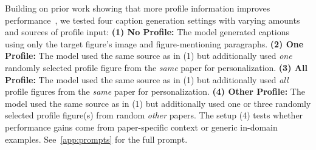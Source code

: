 




Building on prior work showing that more profile information improves performance~\cite{tan2024democratizing}, we tested four caption generation settings with varying amounts and sources of profile input:
\textbf{(1) No Profile:} The model generated captions using only the target figure's image and figure-mentioning paragraphs.
\textbf{(2) One Profile:} The model used the same source as in (1) but additionally used \textit{one} randomly selected profile figure from the \textit{same} paper
for personalization.
\textbf{(3) All Profile:} The model used the same source as in (1) but additionally used \textit{all} profile figures from the \textit{same} paper for personalization.
\textbf{(4) Other Profile:} 
The model used the same source as in (1) but additionally used
one or three randomly selected profile figure(s) from random \textit{other} papers. 
The setup (4) tests whether performance gains come from paper-specific context 
or generic in-domain examples.
See~\autoref{app:prompts} for the full prompt.

